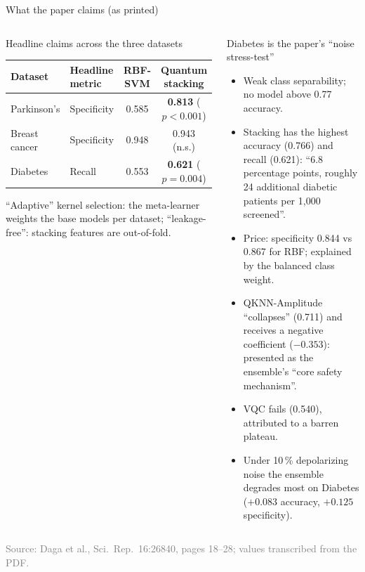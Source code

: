 \documentclass[aspectratio=169,10pt,t,xcolor={table}]{beamer}
\newcommand{\src}[1]{{\tiny\textcolor{gray}{Source: #1}}}
\begin{document}
\begin{frame}{What the paper claims (as printed)}
\begin{columns}[T]
\begin{block}{Headline claims across the three datasets}
\tiny
\begin{tabular}{llcc}
\toprule
Dataset & Headline metric & RBF-SVM & Quantum stacking \\
\midrule
Parkinson's & Specificity & 0.585 & \textbf{0.813} ($p<0.001$) \\
Breast cancer & Specificity & 0.948 & 0.943 (n.s.) \\
Diabetes & Recall & 0.553 & \textbf{0.621} ($p=0.004$) \\
\bottomrule
\end{tabular}
\par\medskip\footnotesize
``Adaptive'' kernel selection: the meta-learner weights the base models per dataset; ``leakage-free'': stacking features are out-of-fold.
\end{block}
\begin{block}{Diabetes is the paper's ``noise stress-test''}
\begin{itemize}\scriptsize
  \item Weak class separability; no model above 0.77 accuracy.
  \item Stacking has the highest accuracy (0.766) and recall (0.621): ``6.8 percentage points, roughly 24 additional diabetic patients per 1,000 screened''.
  \item Price: specificity 0.844 vs 0.867 for RBF; explained by the balanced class weight.
  \item QKNN-Amplitude ``collapses'' (0.711) and receives a negative coefficient ($-0.353$): presented as the ensemble's ``core safety mechanism''.
  \item VQC fails (0.540), attributed to a barren plateau.
  \item Under 10\,\% depolarizing noise the ensemble degrades most on Diabetes ($+0.083$ accuracy, $+0.125$ specificity).
\end{itemize}
\end{block}
\end{columns}
\src{Daga et al., Sci.\ Rep.\ 16:26840, pages 18--28; values transcribed from the PDF.}
\end{frame}
\end{document}

